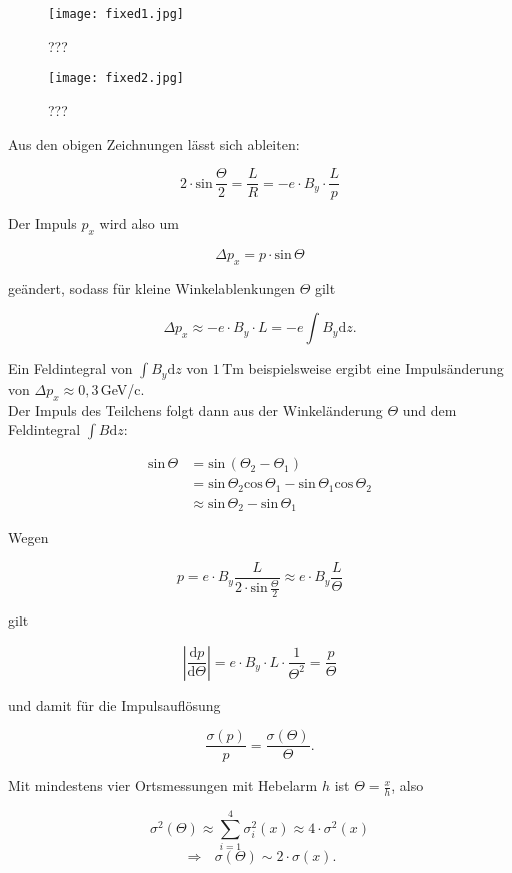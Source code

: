 \begin{figure}[H]
	\centering
	\texttt{[image: fixed1.jpg]}
	\caption{	 ???}
	\label{fixed1}
\end{figure}

\begin{figure}[H]
	\centering
	\texttt{[image: fixed2.jpg]}
	\caption{	 ???}
	\label{fixed2}
\end{figure}

Aus den obigen Zeichnungen lässt sich ableiten: 

\[ 2\cdot \text{sin}\,\frac{\Theta}{2} = \frac{L}{R} = -e\cdot B_y\cdot \frac{L}{p} \]

Der Impuls $p_x$ wird also um 

\[ \Delta p_x = p\cdot \text{sin}\,\Theta \]

geändert, sodass für kleine Winkelablenkungen $\Theta$ gilt

\[ \Delta p_x \approx -e\cdot B_y\cdot L = -e \int B_y \mathrm{d}z.\]

Ein Feldintegral von $\int B_y \mathrm{d}z$ von $1\,$Tm beispielsweise ergibt eine Impulsänderung
von $\Delta p_x \approx 0{,}3\,$GeV/c.
\\
Der Impuls des Teilchens folgt dann aus der Winkeländerung $\Theta$ und dem Feldintegral $\int B
\mathrm{d}z$:

\begin{align*}
\text{sin}\,\Theta &= \text{sin}\,(\Theta_2-\Theta_1) \\
&= \text{sin}\,\Theta_2\text{cos}\,\Theta_1-\text{sin}\,\Theta_1\text{cos}\,\Theta_2 \\
&\approx \text{sin}\,\Theta_2-\text{sin}\,\Theta_1
\end{align*}


Wegen

\[p=e\cdot B_y \frac{L}{2\cdot \text{sin}\,\frac{\Theta}{2}} \approx e\cdot B_y \frac{L}{\Theta} \] 

gilt

\[ \left| \frac{\mathrm{d}p}{\mathrm{d}\Theta} \right| =e\cdot B_y\cdot L \cdot \frac{1}{\Theta^2} =
\frac{p}{\Theta} \]

und damit für die Impulsauflösung

\[ \frac{\sigma(p)}{p}  = \frac{\sigma(\Theta)}{\Theta}. \]

Mit mindestens vier Ortsmessungen mit Hebelarm $h$ ist $\Theta=\frac{x}{h}$, also

\[\sigma^2(\Theta) \approx \sum_{i=1}^4 \sigma_i^2(x) \approx 4\cdot \sigma^2(x)  \]
\[\Rightarrow~~~ \sigma(\Theta) \sim 2\cdot\sigma(x). \]

